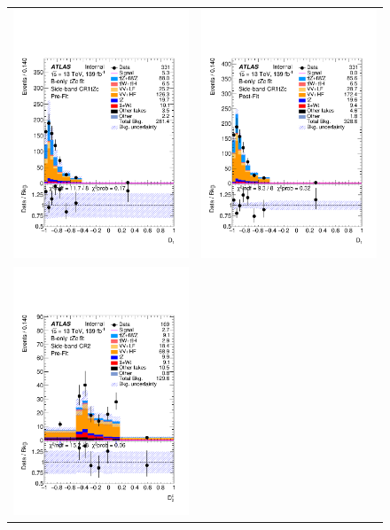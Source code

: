\begin{figure}[htbp]
	\centering
	\begin{tabular}{cc}
		\includegraphics[width=.45\textwidth]{Chapters/CH7/figures/BONLY_CR_UsingDL1rcFullSys/Plots/SBCR1} &
		\includegraphics[width=.45\textwidth]{Chapters/CH7/figures/BONLY_CR_UsingDL1rcFullSys/Plots/SBCR1_postFit} \\
		\includegraphics[width=.45\textwidth]{Chapters/CH7/figures/BONLY_CR_UsingDL1rcFullSys/Plots/SBCR2} &

\end{tabular}
\end{figure}
